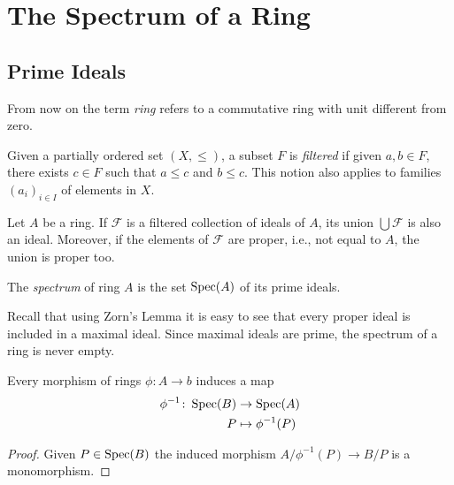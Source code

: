 \newcommand{\iu}{{\mkern1mu i\mkern1mu}}

\chapter{The Spectrum of a Ring}

\section{Prime Ideals}

From now on the term \textsl{ring} refers to a commutative ring with unit different from zero.

\begin{defn}
    Given a partially ordered set $(X,\le)$, a subset $F$ is \textsl{filtered} if given $a,b\in F$, there exists $c\in F$ such that $a\le c$ and $b\le c$. This notion also applies to families $(a_i)_{i\in I}$ of elements in $X$.
\end{defn}

\begin{rem}
    Let $A$ be a ring. If $\mathcal F$ is a filtered collection of ideals of $A$, its union $\bigcup\mathcal F$ is also an ideal. Moreover, if the elements of $\mathcal F$ are proper, i.e., not equal to $A$, the union is proper too.
\end{rem}

\begin{defn}
    The \textsl{spectrum} of ring $A$ is the set $\operatorname{Spec}(A)$ of its prime ideals.
\end{defn}

\begin{rem}\label{rem:proper-is-in-maximal}
    Recall that using Zorn's Lemma it is easy to see that every proper ideal is included in a maximal ideal. Since maximal ideals are prime, the spectrum of a ring is never empty.
\end{rem}

\begin{lem}
    Every morphism of rings $\phi\colon A\to b$ induces a map 
    \begin{align*}
        \phi^{-1}\colon\operatorname{Spec}(B) &\to\operatorname{Spec}(A)\\
            P&\mapsto\phi^{-1}(P)
    \end{align*}
\end{lem}

\begin{proof}
    Given $P\in\operatorname{Spec}(B)$ the induced morphism $A/\phi^{-1}(P)\to B/P$ is a monomorphism.
\end{proof}

